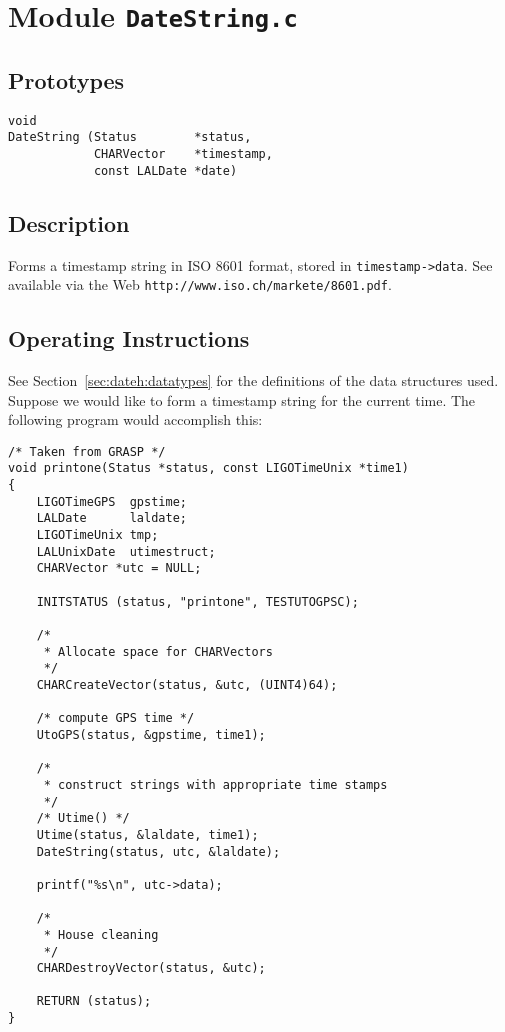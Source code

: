\section{Module \texttt{DateString.c}}
\label{sec:datestringc}

\subsection{Prototypes}
\begin{verbatim}
void
DateString (Status        *status,
            CHARVector    *timestamp,
            const LALDate *date)
\end{verbatim}


\subsection{Description}

Forms a timestamp string in ISO 8601 format, stored in
\texttt{timestamp->data}.  See \cite{iso8601} available via the Web
\texttt{http://www.iso.ch/markete/8601.pdf}.

\subsection{Operating Instructions}
See Section~\ref{sec:dateh:datatypes} for the definitions of the
data structures used.  Suppose we would like to form a timestamp string for
the current time.  The following program would accomplish this:

\begin{verbatim}
/* Taken from GRASP */
void printone(Status *status, const LIGOTimeUnix *time1)
{
    LIGOTimeGPS  gpstime;
    LALDate      laldate;
    LIGOTimeUnix tmp;
    LALUnixDate  utimestruct;
    CHARVector *utc = NULL;

    INITSTATUS (status, "printone", TESTUTOGPSC);

    /*
     * Allocate space for CHARVectors
     */
    CHARCreateVector(status, &utc, (UINT4)64);

    /* compute GPS time */
    UtoGPS(status, &gpstime, time1);

    /*
     * construct strings with appropriate time stamps
     */
    /* Utime() */
    Utime(status, &laldate, time1);
    DateString(status, utc, &laldate);

    printf("%s\n", utc->data);

    /*
     * House cleaning
     */
    CHARDestroyVector(status, &utc);
    
    RETURN (status);
}
\end{verbatim}

